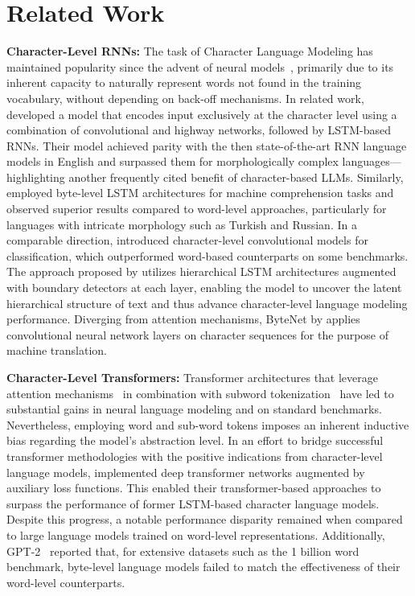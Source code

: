 \section{Related Work}
\label{section:related_work}

\textbf{Character-Level RNNs:} The task of Character Language Modeling has maintained popularity since the advent of neural models~\citep{sutskever2011generating,mikolov2012subword,graves2013generating}, primarily due to its inherent capacity to naturally represent words not found in the training vocabulary, without depending on back-off mechanisms. In related work, \cite{kim2016character} developed a model that encodes input exclusively at the character level using a combination of convolutional and highway networks, followed by LSTM-based RNNs. Their model achieved parity with the then state-of-the-art RNN language models in English and surpassed them for morphologically complex languages—highlighting another frequently cited benefit of character-based LLMs. Similarly, \cite{kenter2018byte} employed byte-level LSTM architectures for machine comprehension tasks and observed superior results compared to word-level approaches, particularly for languages with intricate morphology such as Turkish and Russian. In a comparable direction, \cite{zhang2015character} introduced character-level convolutional models for classification, which outperformed word-based counterparts on some benchmarks. The approach proposed by \citet{chung2019hierarchical} utilizes hierarchical LSTM architectures augmented with boundary detectors at each layer, enabling the model to uncover the latent hierarchical structure of text and thus advance character-level language modeling performance. Diverging from attention mechanisms, ByteNet by \cite{kalchbrenner2016neural} applies convolutional neural network layers on character sequences for the purpose of machine translation.

\textbf{Character-Level Transformers:} Transformer architectures that leverage attention mechanisms~\citep{vaswani2017attention} in combination with subword tokenization~\citep{sennrich-etal-2016-neural} have led to substantial gains in neural language modeling and on standard benchmarks. Nevertheless, employing word and sub-word tokens imposes an inherent inductive bias regarding the model's abstraction level. In an effort to bridge successful transformer methodologies with the positive indications from character-level language models, \citet{al2019character} implemented deep transformer networks augmented by auxiliary loss functions. This enabled their transformer-based approaches to surpass the performance of former LSTM-based character language models. Despite this progress, a notable performance disparity remained when compared to large language models trained on word-level representations. Additionally, GPT-2~\citep{radfordgpt2} reported that, for extensive datasets such as the 1 billion word benchmark, byte-level language models failed to match the effectiveness of their word-level counterparts.

